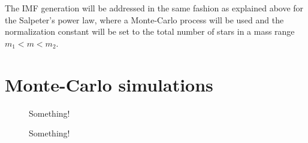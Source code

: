 The IMF generation will be addressed in the same fashion as explained above for the Salpeter's power law, where a Monte-Carlo process will be used and the normalization constant will be set to the total number of stars in a mass range $m_1 < m < m_2$. 

\section{Monte-Carlo simulations}\label{sec:MCSec}

\begin{figure}[!ht]
\centering
\caption{\scriptsize{Something!}}
\label{fig:PeriodMass_Beta}
\end{figure}

\begin{figure}[!ht]
\centering
\caption{\scriptsize{Something!}}
\label{fig:PeriodMajor_Beta}
\end{figure}

